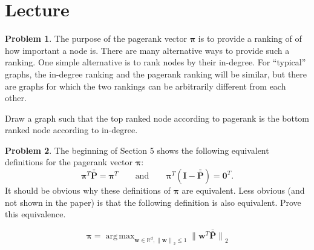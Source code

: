 \documentclass[10pt]{article}
\theoremstyle{definition}
\newtheorem{problem}{Problem}
\newcommand{\R}{\mathbb R}
\DeclareMathOperator*{\argmax}{arg\,max}
\newcommand{\I}{\mathbf I}
\newcommand{\p}{\mathbf P}
\newcommand{\pb}{\bar {\p}}
\newcommand{\pbb}{\bar {\pb}}
\newcommand{\pr}{\bm \pi}
\newcommand{\trans}[1]{{#1}^{T}}
\newcommand{\w}{\mathbf w}
\newcommand{\ltwo}[1]{{\lVert {#1} \rVert}_2}
\begin{document}

\newpage
\section{Lecture}


\begin{problem}
    The purpose of the pagerank vector $\pr$ is to provide a ranking of of how important a node is.
    There are many alternative ways to provide such a ranking.
    One simple alternative is to rank nodes by their in-degree.
    For ``typical'' graphs, the in-degree ranking and the pagerank ranking will be similar,
    but there are graphs for which the two rankings can be arbitrarily different from each other.

    Draw a graph such that the top ranked node according to pagerank is the bottom ranked node according to in-degree.
\end{problem}


\clearpage
\begin{problem}
    The beginning of Section 5 shows the following equivalent definitions for the pagerank vector $\pr$:
    \begin{equation}
        \trans \pr \pbb = \trans \pr
        \qquad
        \text{and}
        \qquad
        \trans \pr (\I - \pbb) = \trans{\bm 0}
        .
    \end{equation}
    It should be obvious why these definitions of $\pr$ are equivalent. 
    Less obvious (and not shown in the paper) is that
    the following definition is also equivalent.
    Prove this equivalence.

    \begin{equation}
        \pr = \argmax_{\w \in \R^d, \ltwo{\w} \le 1} \ltwo{\trans \w \pbb}
    \end{equation}
\end{problem}


\newpage
\end{document}
